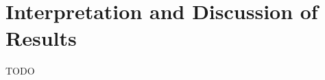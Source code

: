 
\chapter{Interpretation and Discussion of Results} \label{cha:interpretationAndDiscussionOfResults}

TODO


\clearpage
